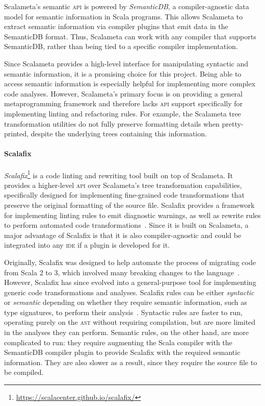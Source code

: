 \documentclass[../../main.tex]{subfiles}
\begin{document}
Scalameta's semantic \textsc{api} is powered by \textit{SemanticDB}, a compiler-agnostic data model for semantic information in Scala programs.
This allows Scalameta to extract semantic information via compiler plugins that emit data in the SemanticDB format.
Thus, Scalameta can work with any compiler that supports SemanticDB, rather than being tied to a specific compiler implementation.

Since Scalameta provides a high-level interface for manipulating syntactic and semantic information, it is a promising choice for this project.
Being able to access semantic information is especially helpful for implementing more complex code analyses.
However, Scalameta's primary focus is on providing a general metaprogramming framework and therefore lacks \textsc{api} support specifically for implementing linting and refactoring rules.
For example, the Scalameta tree transformation utilities do not fully preserve formatting details when pretty-printed, despite the underlying trees containing this information.

\paragraph{Scalafix}
\textit{Scalafix}\footnote{\url{https://scalacenter.github.io/scalafix/}} is a code linting and rewriting tool built on top of Scalameta.
It provides a higher-level \textsc{api} over Scalameta's tree transformation capabilities, specifically designed for implementing fine-grained code transformations that preserve the original formatting of the source file.
Scalafix provides a framework for implementing linting rules to emit diagnostic warnings, as well as rewrite rules to perform automated code transformations~\cite{geirsson_catch_2017}.
Since it is built on Scalameta, a major advantage of Scalafix is that it is also compiler-agnostic and could be integrated into any \textsc{ide} if a plugin is developed for it.

Originally, Scalafix was designed to help automate the process of migrating code from Scala 2 to 3, which involved many breaking changes to the language~\cite{geirsson_scalafix_2016}.
However, Scalafix has since evolved into a general-purpose tool for implementing generic code transformations and analyses.
Scalafix rules can be either \emph{syntactic} or \emph{semantic} depending on whether they require semantic information, such as type signatures, to perform their analysis~\cite{scalacenter_scalafix_2024}.
Syntactic rules are faster to run, operating purely on the \textsc{ast} without requiring compilation, but are more limited in the analyses they can perform.
Semantic rules, on the other hand, are more complicated to run: they require augmenting the Scala compiler with the SemanticDB compiler plugin to provide Scalafix with the required semantic information.
They are also slower as a result, since they require the source file to be compiled.
\end{document}

